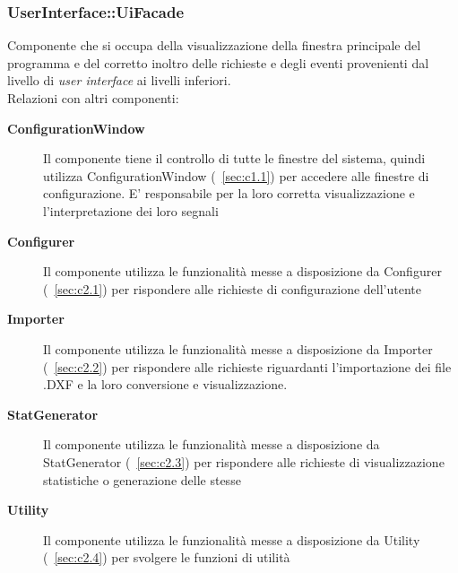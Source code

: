 \subsubsection{UserInterface::UiFacade} \label{sec:c1.2}
Componente che si occupa della visualizzazione della finestra principale del programma e del corretto inoltro delle richieste e degli eventi provenienti dal livello di \textit{user interface} ai livelli inferiori.\\
Relazioni con altri componenti: 
\begin{description} 
\item [\textbf{ConfigurationWindow}]
Il componente tiene il controllo di tutte le finestre del sistema, quindi utilizza ConfigurationWindow (~\ref{sec:c1.1}) per accedere alle finestre di configurazione. E' responsabile per la loro corretta visualizzazione e l'interpretazione dei loro segnali 
\item [\textbf{Configurer}]
Il componente utilizza le funzionalità messe a disposizione da Configurer (~\ref{sec:c2.1}) per rispondere alle richieste di configurazione dell'utente 
\item [\textbf{Importer}]
Il componente utilizza le funzionalità messe a disposizione da Importer (~\ref{sec:c2.2}) per rispondere alle richieste riguardanti l'importazione dei file .DXF e la loro conversione e visualizzazione. 
\item [\textbf{StatGenerator}]
Il componente utilizza le funzionalità messe a disposizione da StatGenerator (~\ref{sec:c2.3}) per rispondere alle richieste di visualizzazione statistiche o generazione delle stesse 
\item [\textbf{Utility}]
Il componente utilizza le funzionalità messe a disposizione da Utility (~\ref{sec:c2.4}) per svolgere le funzioni di utilità 
\end{description} 

